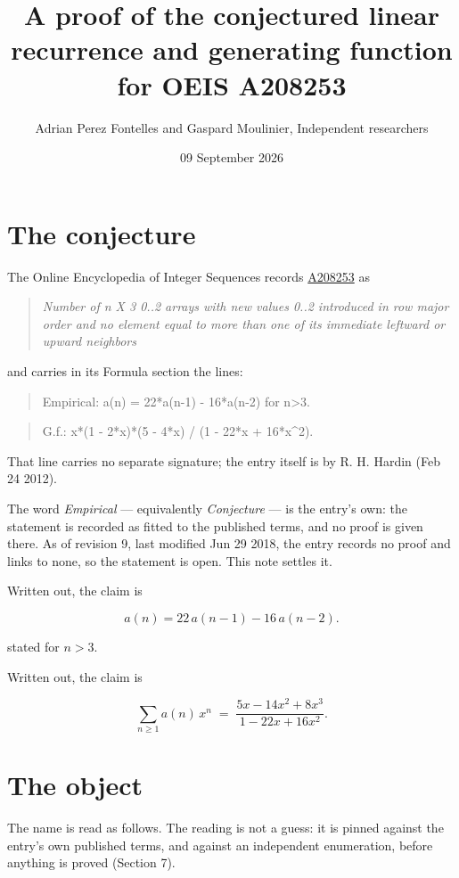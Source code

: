 \documentclass[11pt]{article}
\title{A proof of the conjectured linear recurrence and generating function for OEIS A208253}
\author{Adrian Perez Fontelles and Gaspard Moulinier, Independent researchers}
\date{09 September 2026}
\theoremstyle{definition}
\begin{document}
\maketitle
\section{The conjecture}

The Online Encyclopedia of Integer Sequences records \href{https://oeis.org/A208253}{A208253} as

\begin{quote}\itshape Number of n X 3 0..2 arrays with new values 0..2 introduced in row major order and no element equal to more than one of its immediate leftward or upward neighbors\end{quote}

and carries in its Formula section the lines:

\begin{quote}\ttfamily Empirical: a(n) = 22*a(n-1) - 16*a(n-2) for n>3.\end{quote}

\begin{quote}\ttfamily G.f.: x*(1 - 2*x)*(5 - 4*x) / (1 - 22*x + 16*x\textasciicircum{}2).\end{quote}

That line carries no separate signature; the entry itself is by R. H. Hardin (Feb 24 2012).

The word {\itshape Empirical} --- equivalently {\itshape Conjecture} --- is the entry's own: the statement is recorded as fitted to the published terms, and no proof is given there. As of revision 9, last modified Jun 29 2018, the entry records no proof and links to none, so the statement is open. This note settles it.

Written out, the claim is

\[a(n) = 22\,a(n-1) - 16\,a(n-2).\]

stated for $n > 3$.

Written out, the claim is

\[\sum_{n \ge 1} a(n)\,x^n \;=\; \frac{5x - 14x^{2} + 8x^{3}}{1 - 22x + 16x^{2}}.\]

\section{The object}

The name is read as follows. The reading is not a guess: it is pinned against the entry's own published terms, and against an independent enumeration, before anything is proved (Section 7).
\end{document}
